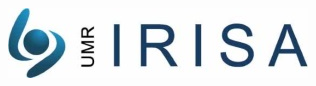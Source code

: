 \documentclass[a4paper,11pt]{article}
\begin{document}
\begin{figure}[!hbt]
\begin{minipage}{0.3\linewidth}
   \end{minipage}
   \begin{minipage}{0.3\linewidth}
      \includegraphics[width=\textwidth]{1-PreEtude/img/logo_irisa.jpg}
   \end{minipage}
\end{figure}

\pagebreak

\tableofcontents
\pagebreak


\pagebreak

\pagebreak

\pagebreak

\pagebreak

\pagebreak

\end{document}
